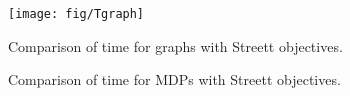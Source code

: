 \newpage

\setlength{\abovecaptionskip}{2pt}

\begin{figure}[t]
\centering
\texttt{[image: fig/Tgraph]}
\caption{Comparison of time for graphs with Streett objectives.}
\label{fig:graphsT}
\end{figure}

\setlength{\abovecaptionskip}{4pt}

\begin{figure}
\begin{center}
     \hfill
\caption{Comparison of time for MDPs with Streett objectives.}
\label{fig:mdpsT}
\end{center}
\end{figure}
